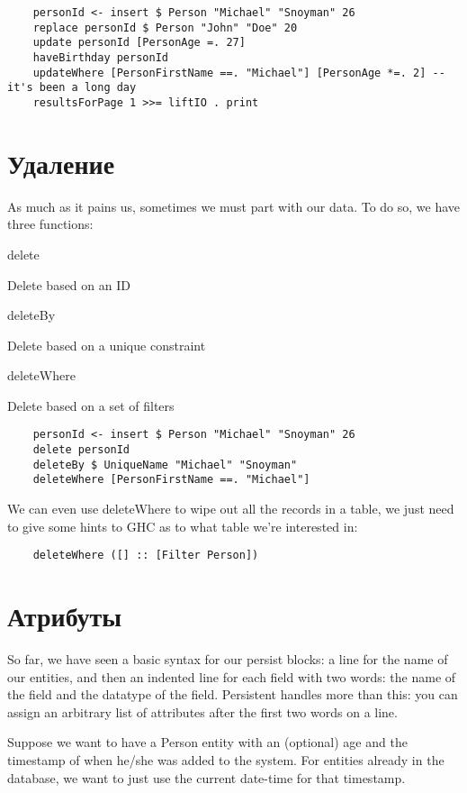 \begin{lstlisting}
    personId <- insert $ Person "Michael" "Snoyman" 26
    replace personId $ Person "John" "Doe" 20
    update personId [PersonAge =. 27]
    haveBirthday personId
    updateWhere [PersonFirstName ==. "Michael"] [PersonAge *=. 2] -- it's been a long day
    resultsForPage 1 >>= liftIO . print
\end{lstlisting}

\section{Удаление} %

As much as it pains us, sometimes we must part with our data. To do so, we have three functions:

delete

Delete based on an ID

deleteBy

Delete based on a unique constraint

deleteWhere

Delete based on a set of filters

\begin{lstlisting}
    personId <- insert $ Person "Michael" "Snoyman" 26
    delete personId
    deleteBy $ UniqueName "Michael" "Snoyman"
    deleteWhere [PersonFirstName ==. "Michael"]
\end{lstlisting}

We can even use deleteWhere to wipe out all the records in a table, we just need to give some hints to GHC as to what table we're interested in:

\begin{lstlisting}
    deleteWhere ([] :: [Filter Person])
\end{lstlisting}

\section{Атрибуты} %

So far, we have seen a basic syntax for our persist blocks: a line for the name of our entities, and then an indented line for each field with two words: the name of the field and the datatype of the field. Persistent handles more than this: you can assign an arbitrary list of attributes after the first two words on a line.

Suppose we want to have a Person entity with an (optional) age and the timestamp of when he/she was added to the system. For entities already in the database, we want to just use the current date-time for that timestamp.

